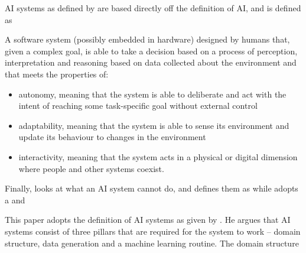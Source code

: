 AI systems as defined by \textcite{Dignum_2021} are based directly off the definition of AI, and is defined as 
\begin{displayquote}
    A software system (possibly embedded in hardware) designed by humans that, given a complex goal, is able to take a decision based on a process of perception, interpretation and reasoning based on data collected about the environment and that meets the properties of: 
    \begin{itemize}
        \item autonomy, meaning that the system is able to deliberate and act with the intent of reaching some task-specific goal without external control 
        \item adaptability, meaning that the system is able to sense its environment and update its behaviour to changes in the environment 
        \item interactivity, meaning that the system acts in a physical or digital dimension where people and other systems coexist. \parencite[p.~2]{Dignum_2021}
    \end{itemize}
\end{displayquote}

Finally, \textcite[p.~8]{Merhi_2022} looks at what an AI system cannot do, and defines them as  while \textcite[p.~2]{vanBruxvoort_2021} adopts a  and 

This paper adopts the definition of AI systems as given by \textcite{Taddy_2018_AIsystem}. He argues that AI systems consist of three pillars that are required for the system to work -- domain structure, data generation and a machine learning routine. The domain structure



